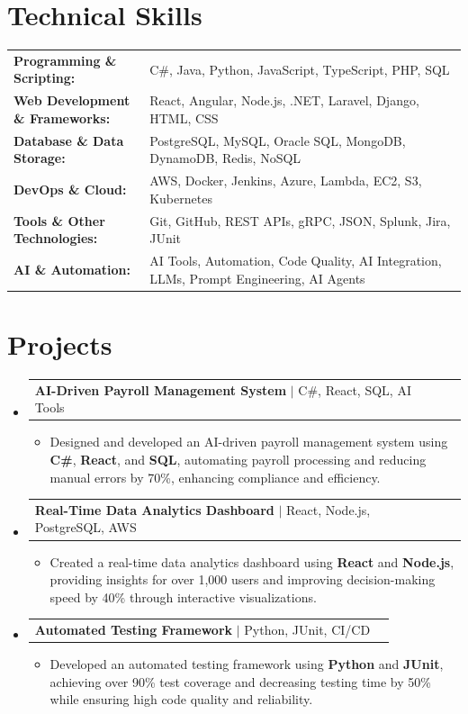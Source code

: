 \documentclass[letterpaper,10pt]{article}
\makeatletter
\newcommand{\resumeItem}[1]{
  \item{\fontsize{8pt}{9pt}\selectfont
    #1 \vspace{-3pt}
  }
}
\newcommand{\resumeProjectHeading}[2]{
    \item
    \begin{tabular*}{1.001\textwidth}{l@{\extracolsep{\fill}}r}
      \fontsize{8.5pt}{10pt}#1 & \textbf{\fontsize{8.5pt}{10pt} #2}\\
    \end{tabular*}\vspace{-7pt}
}
\newcommand{\resumeSubHeadingListStart}{\begin{itemize}[leftmargin=0pt, label={}]}
\newcommand{\resumeSubHeadingListEnd}{\end{itemize}}
\newcommand{\resumeItemListStart}{\begin{itemize}[leftmargin=*]}
\newcommand{\resumeItemListEnd}{\end{itemize}\vspace{-5pt}}
\makeatother
\begin{document}
\section{Technical Skills}
        \vspace{-14pt}
        \begin{table}[h]
            \fontsize{8pt}{9pt}\selectfont
            \begin{tabular}{p{0.3\linewidth} p{0.7\linewidth}}
                \textbf{Programming \& Scripting:} & C\#, Java, Python, JavaScript, TypeScript, PHP, SQL \\
                \textbf{Web Development \& Frameworks:} & React, Angular, Node.js, .NET, Laravel, Django, HTML, CSS \\
                \textbf{Database \& Data Storage:} & PostgreSQL, MySQL, Oracle SQL, MongoDB, DynamoDB, Redis, NoSQL \\
                \textbf{DevOps \& Cloud:} & AWS, Docker, Jenkins, Azure, Lambda, EC2, S3, Kubernetes \\
                \textbf{Tools \& Other Technologies:} & Git, GitHub, REST APIs, gRPC, JSON, Splunk, Jira, JUnit \\
                \textbf{AI \& Automation:} & AI Tools, Automation, Code Quality, AI Integration, LLMs, Prompt Engineering, AI Agents \\
            \end{tabular}
        \end{table}
 \vspace{-18pt}

\section{Projects}
    \vspace{-5pt}
    \resumeSubHeadingListStart
          \resumeProjectHeading
            {\textbf{AI-Driven Payroll Management System} $|$ C#, React, SQL, AI Tools}{}
            \resumeItemListStart
                \resumeItem{Designed and developed an AI-driven payroll management system using \textbf{C#}, \textbf{React}, and \textbf{SQL}, automating payroll processing and reducing manual errors by 70\%, enhancing compliance and efficiency.}
            \resumeItemListEnd
        \vspace{-12pt}
    
        \resumeProjectHeading
            {\textbf{Real-Time Data Analytics Dashboard} $|$ React, Node.js, PostgreSQL, AWS}{}
        \resumeItemListStart
                \resumeItem{Created a real-time data analytics dashboard using \textbf{React} and \textbf{Node.js}, providing insights for over 1,000 users and improving decision-making speed by 40\% through interactive visualizations.}
        \resumeItemListEnd
      \vspace{-12pt}
      \resumeProjectHeading
        {\textbf{Automated Testing Framework} $|$ Python, JUnit, CI/CD}{}
    \resumeItemListStart
            \resumeItem{Developed an automated testing framework using \textbf{Python} and \textbf{JUnit}, achieving over 90\% test coverage and decreasing testing time by 50\% while ensuring high code quality and reliability.}
    \resumeItemListEnd
    \resumeSubHeadingListEnd
\end{document}
